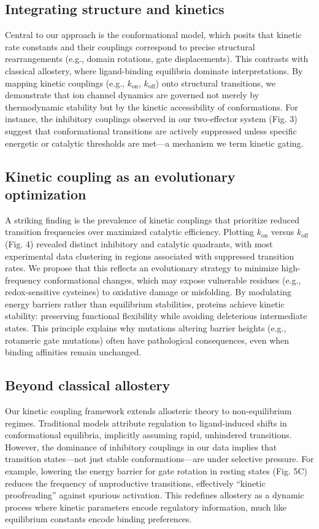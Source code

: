 \documentclass[a4paper,12pt]{article}
\begin{document}
	
	\subsection{Integrating structure and kinetics}  
	Central to our approach is the conformational model, which posits that kinetic rate constants and their couplings correspond to precise structural rearrangements (e.g., domain rotations, gate displacements). This contrasts with classical allostery, where ligand-binding equilibria dominate interpretations. By mapping kinetic couplings (e.g., \( k_{\text{on}} \), \( k_{\text{off}} \)) onto structural transitions, we demonstrate that ion channel dynamics are governed not merely by thermodynamic stability but by the kinetic accessibility of conformations. For instance, the inhibitory couplings observed in our two-effector system (Fig. 3) suggest that conformational transitions are actively suppressed unless specific energetic or catalytic thresholds are met—a mechanism we term kinetic gating.  
	
	
	\subsection{Kinetic coupling as an evolutionary optimization} 
	A striking finding is the prevalence of kinetic couplings that prioritize reduced transition frequencies over maximized catalytic efficiency. Plotting \( k_{\text{on}} \) versus \( k_{\text{off}} \) (Fig. 4) revealed distinct inhibitory and catalytic quadrants, with most experimental data clustering in regions associated with suppressed transition rates. We propose that this reflects an evolutionary strategy to minimize high-frequency conformational changes, which may expose vulnerable residues (e.g., redox-sensitive cysteines) to oxidative damage or misfolding. By modulating energy barriers rather than equilibrium stabilities, proteins achieve kinetic stability: preserving functional flexibility while avoiding deleterious intermediate states. This principle explains why mutations altering barrier heights (e.g., rotameric gate mutations) often have pathological consequences, even when binding affinities remain unchanged.  
	
	
	
	\subsection{Beyond classical allostery}
	Our kinetic coupling framework extends allosteric theory to non-equilibrium regimes. Traditional models attribute regulation to ligand-induced shifts in conformational equilibria, implicitly assuming rapid, unhindered transitions. However, the dominance of inhibitory couplings in our data implies that transition states—not just stable conformations—are under selective pressure. For example, lowering the energy barrier for gate rotation in resting states (Fig. 5C) reduces the frequency of unproductive transitions, effectively “kinetic proofreading” against spurious activation. This redefines allostery as a dynamic process where kinetic parameters encode regulatory information, much like equilibrium constants encode binding preferences.  
	
\end{document}
